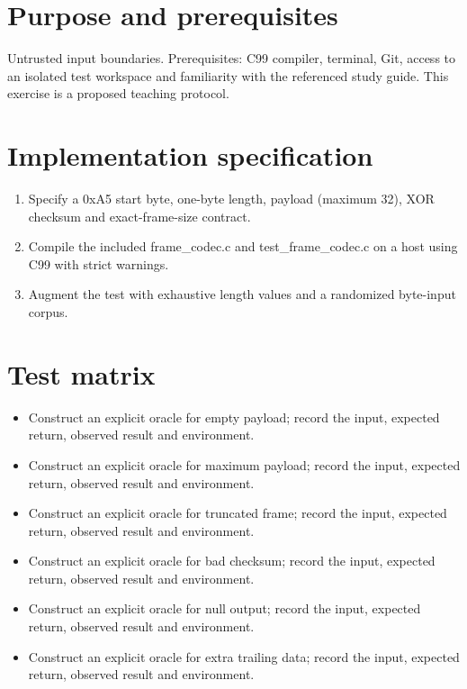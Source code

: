 \documentclass[10pt,letterpaper]{article}
\begin{document}
\makedoctitle
\makedocsummary
\section{Purpose and prerequisites}
Untrusted input boundaries. Prerequisites: C99 compiler, terminal, Git, access to an isolated test workspace and familiarity with the referenced study guide. This exercise is a proposed teaching protocol.
\section{Implementation specification}
\begin{enumerate}
\item Specify a 0xA5 start byte, one-byte length, payload (maximum 32), XOR checksum and exact-frame-size contract.
\item Compile the included frame\_codec.c and test\_frame\_codec.c on a host using C99 with strict warnings.
\item Augment the test with exhaustive length values and a randomized byte-input corpus.
\end{enumerate}

\section{Test matrix}
\begin{itemize}
\item Construct an explicit oracle for empty payload; record the input, expected return, observed result and environment.
\item Construct an explicit oracle for maximum payload; record the input, expected return, observed result and environment.
\item Construct an explicit oracle for truncated frame; record the input, expected return, observed result and environment.
\item Construct an explicit oracle for bad checksum; record the input, expected return, observed result and environment.
\item Construct an explicit oracle for null output; record the input, expected return, observed result and environment.
\item Construct an explicit oracle for extra trailing data; record the input, expected return, observed result and environment.
\end{itemize}
\end{document}
